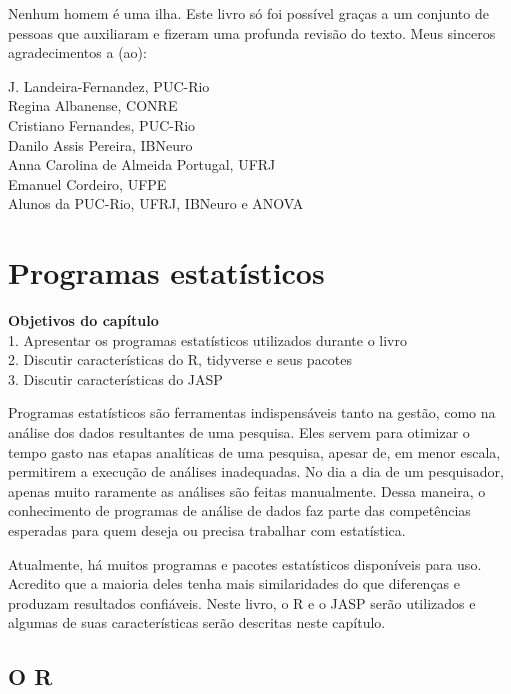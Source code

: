 \documentclass[
]{book}
\newenvironment{objectives}{
  \definecolor{shadecolor}{rgb}{0.764,0.992,0.686}  %
  \color{black}
  \begin{shaded}}
 {\end{shaded}}
\begin{document}
Nenhum homem é uma ilha. Este livro só foi possível graças a um conjunto de pessoas que auxiliaram e fizeram uma profunda revisão do texto. Meus sinceros agradecimentos a (ao):

J. Landeira-Fernandez, PUC-Rio\\
Regina Albanense, CONRE\\
Cristiano Fernandes, PUC-Rio\\
Danilo Assis Pereira, IBNeuro\\
Anna Carolina de Almeida Portugal, UFRJ\\
Emanuel Cordeiro, UFPE\\
Alunos da PUC-Rio, UFRJ, IBNeuro e ANOVA

\hypertarget{programas-estatuxedsticos}{%
\chapter{Programas estatísticos}\label{programas-estatuxedsticos}}

\begin{objectives}
\textbf{Objetivos do capítulo}\\
1. Apresentar os programas estatísticos utilizados durante o livro\\
2. Discutir características do R, tidyverse e seus pacotes\\
3. Discutir características do JASP

\end{objectives}

Programas estatísticos são ferramentas indispensáveis tanto na gestão, como na análise dos dados resultantes de uma pesquisa. Eles servem para otimizar o tempo gasto nas etapas analíticas de uma pesquisa, apesar de, em menor escala, permitirem a execução de análises inadequadas. No dia a dia de um pesquisador, apenas muito raramente as análises são feitas manualmente. Dessa maneira, o conhecimento de programas de análise de dados faz parte das competências esperadas para quem deseja ou precisa trabalhar com estatística.

Atualmente, há muitos programas e pacotes estatísticos disponíveis para uso. Acredito que a maioria deles tenha mais similaridades do que diferenças e produzam resultados confiáveis. Neste livro, o R e o JASP serão utilizados e algumas de suas características serão descritas neste capítulo.

\hypertarget{o-r}{%
\section{O R}\label{o-r}}
\end{document}
